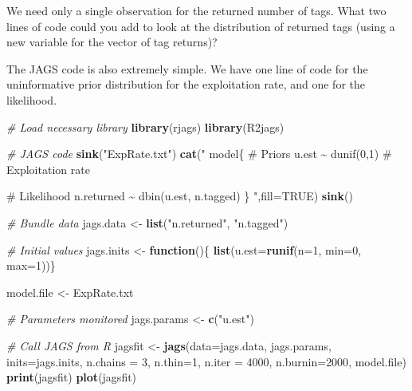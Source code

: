 \documentclass[
]{krantz}
\makeatletter
\newenvironment{Shaded}{\begin{snugshade}}{\end{snugshade}}
\newcommand{\AttributeTok}[1]{\textcolor[rgb]{0.27,0.27,0.27}{#1}}
\newcommand{\CommentTok}[1]{\textcolor[rgb]{0.37,0.37,0.37}{\textit{#1}}}
\newcommand{\ConstantTok}[1]{\textcolor[rgb]{0.37,0.37,0.37}{#1}}
\newcommand{\ControlFlowTok}[1]{\textcolor[rgb]{0.27,0.27,0.27}{\textbf{#1}}}
\newcommand{\DecValTok}[1]{\textcolor[rgb]{0.06,0.06,0.06}{#1}}
\newcommand{\FunctionTok}[1]{\textcolor[rgb]{0.27,0.27,0.27}{\textbf{#1}}}
\newcommand{\NormalTok}[1]{#1}
\newcommand{\OtherTok}[1]{\textcolor[rgb]{0.37,0.37,0.37}{#1}}
\newcommand{\StringTok}[1]{\textcolor[rgb]{0.5,0.5,0.5}{#1}}
\newenvironment{kframe}{%
\medskip{}
\setlength{\fboxsep}{.8em}
 \def\at@end@of@kframe{}%
 \ifinner\ifhmode%
  \def\at@end@of@kframe{\end{minipage}}%
  \begin{minipage}{\columnwidth}%
 \fi\fi%
 \def\FrameCommand##1{\hskip\@totalleftmargin \hskip-\fboxsep
 \colorbox{shadecolor}{##1}\hskip-\fboxsep
     \hskip-\linewidth \hskip-\@totalleftmargin \hskip\columnwidth}%
 \MakeFramed {\advance\hsize-\width
   \@totalleftmargin\z@ \linewidth\hsize
   \@setminipage}}%
 {\par\unskip\endMakeFramed%
 \at@end@of@kframe}
\renewenvironment{Shaded}{\begin{kframe}}{\end{kframe}}
\makeatother
\begin{document}
We need only a single observation for the returned number of tags. What two lines of code could you add to look at the distribution of returned tags (using a new variable for the vector of tag returns)?

The JAGS code is also extremely simple. We have one line of code for the uninformative prior distribution for the exploitation rate, and one for the likelihood.

\begin{Shaded}
\begin{Highlighting}[]
\CommentTok{\# Load necessary library}
\FunctionTok{library}\NormalTok{(rjags)}
\FunctionTok{library}\NormalTok{(R2jags)}

\CommentTok{\# JAGS code}
\FunctionTok{sink}\NormalTok{(}\StringTok{"ExpRate.txt"}\NormalTok{)}
\FunctionTok{cat}\NormalTok{(}\StringTok{"}
\StringTok{model\{}
\StringTok{    \# Priors}
\StringTok{    u.est \textasciitilde{} dunif(0,1)  \# Exploitation rate}

\StringTok{    \# Likelihood}
\StringTok{    n.returned \textasciitilde{} dbin(u.est, n.tagged)}
\StringTok{\}}
\StringTok{    "}\NormalTok{,}\AttributeTok{fill=}\ConstantTok{TRUE}\NormalTok{)}
\FunctionTok{sink}\NormalTok{()}

\CommentTok{\# Bundle data}
\NormalTok{jags.data }\OtherTok{\textless{}{-}} \FunctionTok{list}\NormalTok{(}\StringTok{"n.returned"}\NormalTok{, }\StringTok{"n.tagged"}\NormalTok{)}

\CommentTok{\# Initial values}
\NormalTok{jags.inits }\OtherTok{\textless{}{-}} \ControlFlowTok{function}\NormalTok{()\{ }\FunctionTok{list}\NormalTok{(}\AttributeTok{u.est=}\FunctionTok{runif}\NormalTok{(}\AttributeTok{n=}\DecValTok{1}\NormalTok{, }\AttributeTok{min=}\DecValTok{0}\NormalTok{, }\AttributeTok{max=}\DecValTok{1}\NormalTok{))\}}

\NormalTok{model.file }\OtherTok{\textless{}{-}} \StringTok{\textquotesingle{}ExpRate.txt\textquotesingle{}}

\CommentTok{\# Parameters monitored}
\NormalTok{jags.params }\OtherTok{\textless{}{-}} \FunctionTok{c}\NormalTok{(}\StringTok{"u.est"}\NormalTok{)}

\CommentTok{\# Call JAGS from R}
\NormalTok{jagsfit }\OtherTok{\textless{}{-}} \FunctionTok{jags}\NormalTok{(}\AttributeTok{data=}\NormalTok{jags.data, jags.params, }\AttributeTok{inits=}\NormalTok{jags.inits,}
                \AttributeTok{n.chains =} \DecValTok{3}\NormalTok{, }\AttributeTok{n.thin=}\DecValTok{1}\NormalTok{, }\AttributeTok{n.iter =} \DecValTok{4000}\NormalTok{, }\AttributeTok{n.burnin=}\DecValTok{2000}\NormalTok{,}
\NormalTok{                model.file)}
\FunctionTok{print}\NormalTok{(jagsfit)}
\FunctionTok{plot}\NormalTok{(jagsfit)}
\end{Highlighting}
\end{Shaded}
\end{document}
